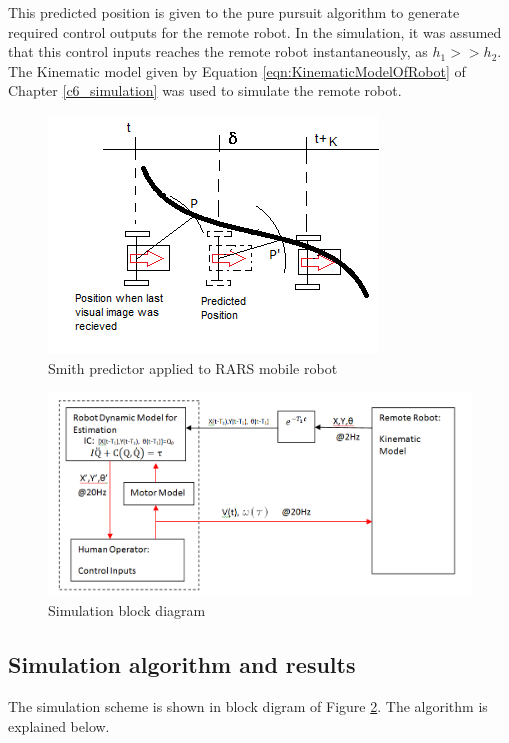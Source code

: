 This predicted position is given to the pure pursuit algorithm to generate required control outputs for the remote robot. In the simulation, it was assumed that this control inputs reaches the remote robot instantaneously, as $h_1>> h_2$.  The   Kinematic model  given by Equation \ref{eqn:KinematicModelOfRobot} of Chapter \ref{c6_simulation} was used to simulate the remote robot.
 \begin{figure}
	\includegraphics[width=\linewidth]{Chapter7/fig/robotPredictPos}
	\caption{Smith predictor applied to RARS mobile robot}
	\label{fig:SmithRobot}
\end{figure}
 \begin{figure}
	\includegraphics[width=\linewidth]{Chapter7/fig/Sumilation_BlkDgm}
	\caption{Simulation block diagram}
	\label{fig:SimBlock}
\end{figure}
\subsection{Simulation algorithm and  results} 
The simulation scheme is  shown in block digram of Figure \ref{fig:SimBlock}. The algorithm  is explained  below.


